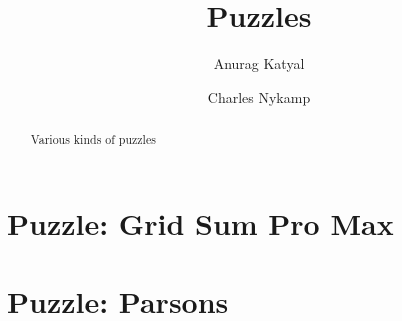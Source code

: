 \documentclass{ximera}
\title{Puzzles}
\author{Anurag Katyal \and Charles Nykamp}
\begin{document}
\begin{abstract}
  Various kinds of puzzles
\end{abstract}
\maketitle
\label{xim:doenetDemo}

\section{Puzzle: Grid Sum Pro Max}

\section{Puzzle: Parsons}
\end{document}

